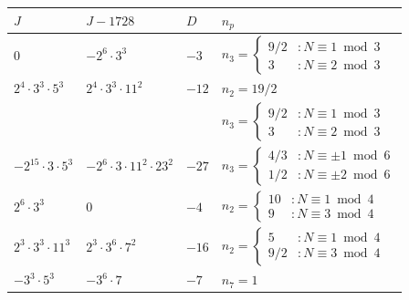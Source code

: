 \documentclass[11pt]{amsart}
\theoremstyle{definition}
\begin{document}
\begin{table}[h]
{\small
    \centering
    \begin{tabular}{|l|l|l|l|} \hline
        $J$ & $J-1728$ & $D$ & $n_p$ \\ \hline\hline 
        
         $0$ & $-2^6\cdot 3^3$ & $-3$ & 
         $n_3 = \left\{\begin{array}{ll}
            9/2 & : N \equiv 1 \bmod 3 \\
            3 & : N \equiv 2 \bmod 3 
        \end{array}\right.$ \\ \hline

        $2^{4} \cdot 3^{3} \cdot 5^{3}$ & $2^{4} \cdot 3^{3} \cdot 11^{2}$ & $-12$ & 
        $n_2 = 19/2$ \\
        & & & 
        $n_3 = \left\{\begin{array}{ll}
            9/2 & : N \equiv 1 \bmod 3 \\
            3 & : N \equiv 2 \bmod 3 
        \end{array}\right.$ \\ \hline
        
        $-2^{15} \cdot 3 \cdot 5^{3}$ & $- 2^{6} \cdot 3 \cdot 11^{2} \cdot 23^{2}$ & $-27$ & 
        $n_3 = \left\{\begin{array}{ll}
            4/3 & : N \equiv \pm1 \bmod 6  \\
             1/2 & : N \equiv \pm 2 \bmod 6
        \end{array}\right.$\\ \hline
        
        $2^{6} \cdot 3^{3}$ & $0$ & $-4$ & 
        $n_2 = \left\{\begin{array}{ll}
            10 & : N \equiv 1 \bmod 4  \\
             9 & : N \equiv 3 \bmod 4
        \end{array}\right.$\\ \hline
        
        $2^{3} \cdot 3^{3} \cdot 11^{3}$ & $2^{3} \cdot 3^{6} \cdot 7^{2}$ & $-16$ & 
        $n_2 = \left\{\begin{array}{ll}
            5 & : N \equiv 1 \bmod 4  \\
            9/2 & : N \equiv 3 \bmod 4
        \end{array}\right.$ \\ \hline
        
        $- 3^{3} \cdot 5^{3}$ & $- 3^{6} \cdot 7$ & $-7$ & $n_7 = 1$ \\ \hline
        

\end{tabular}}
\end{table}
\end{document}
